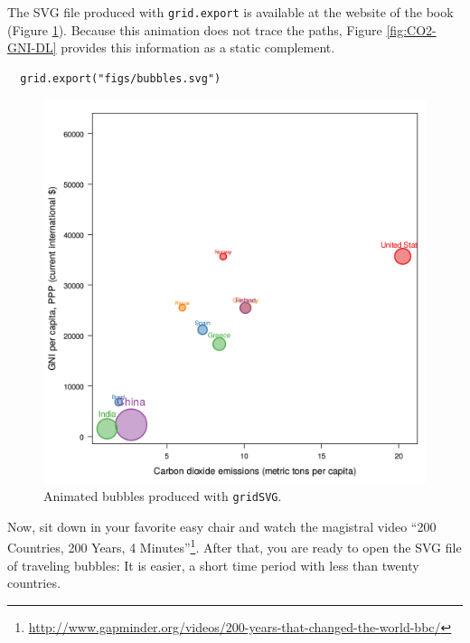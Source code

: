 The SVG file produced with \texttt{grid.export} is available at the website
of the book (Figure \ref{fig:bubblesSVG}). Because this animation does
not trace the paths, Figure \ref{fig:CO2-GNI-DL} provides this
information as a static complement.


\lstset{language=r,label= ,caption= ,captionpos=b,numbers=none}
\begin{lstlisting}
  grid.export("figs/bubbles.svg")
\end{lstlisting}

\begin{figure}
  \centering
  \includegraphics[width=\textwidth]{figs/bubbles.png}
  \caption{Animated bubbles produced with \texttt{gridSVG}.}
  \label{fig:bubblesSVG}
\end{figure}

Now, sit down in your favorite easy chair and watch the magistral
video ``200 Countries, 200 Years, 4 Minutes''\footnote{\url{http://www.gapminder.org/videos/200-years-that-changed-the-world-bbc/}}. After that, you are
ready to open the SVG file of traveling bubbles: It is easier, a short
time period with less than twenty countries.
